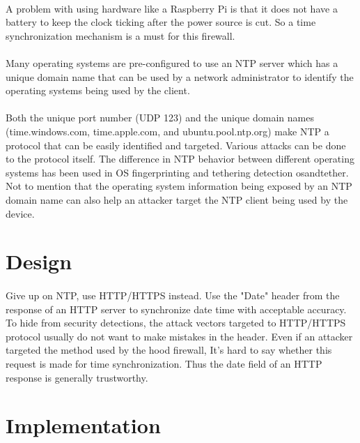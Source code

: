 \documentclass[mscthesis]{usiinfthesis}
\begin{document}
\paragraph{}
A problem with using hardware like a Raspberry Pi is that it does not have a battery to keep the clock ticking after the power source is cut. So a time synchronization mechanism is a must for this firewall.
\paragraph{}
Many operating systems are pre-configured to use an NTP server which has a unique domain name that can be used by a network administrator to identify the operating systems being used by the client.
\paragraph{}
Both the unique port number (UDP 123) and the unique domain names (time.windows.com, time.apple.com, and ubuntu.pool.ntp.org) make NTP a protocol that can be easily identified and targeted. Various attacks can be done to the protocol itself\citep{ntp:attack}. The difference in NTP behavior between different operating systems has been used in OS fingerprinting and tethering detection {osandtether}. Not to mention that the operating system information being exposed by an NTP domain name can also help an attacker target the NTP client being used by the device.

\section{Design}
\paragraph{}
Give up on NTP, use HTTP/HTTPS instead. Use the "Date" header from the response of an HTTP server to synchronize date time with acceptable accuracy. To hide from security detections, the attack vectors targeted to HTTP/HTTPS protocol usually do not want to make mistakes in the header. Even if an attacker targeted the method used by the hood firewall, It's hard to say whether this request is made for time synchronization. Thus the date field of an HTTP response is generally trustworthy.

\section{Implementation}
\end{document}
